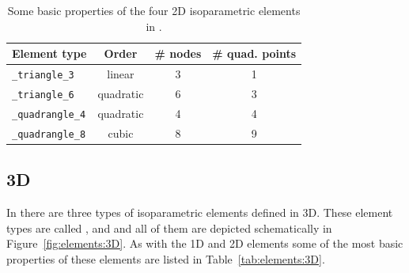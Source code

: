 \begin{table}[!htb]
\begin{center}
\begin{tabular}{l|ccc}
\toprule
Element type & Order & \# nodes & \# quad. points \\
\midrule
\texttt{\_triangle\_3} & linear & 3 & 1 \\
\texttt{\_triangle\_6} & quadratic & 6 & 3 \\
\hline
\texttt{\_quadrangle\_4} & quadratic & 4 & 4 \\
\texttt{\_quadrangle\_8} & cubic & 8 & 9 \\
\bottomrule
\end{tabular}
\end{center}
\caption{Some basic properties of the four 2D isoparametric elements in \akantu.}
\label{tab:elements:2D}
\end{table}

\subsection*{3D}

In \akantu there are three types of isoparametric elements defined in 3D. These element types are called ,  and  and all of them are depicted schematically in Figure~\ref{fig:elements:3D}. As with the 1D and 2D elements some of the most basic properties of these elements are listed in Table~\ref{tab:elements:3D}.

